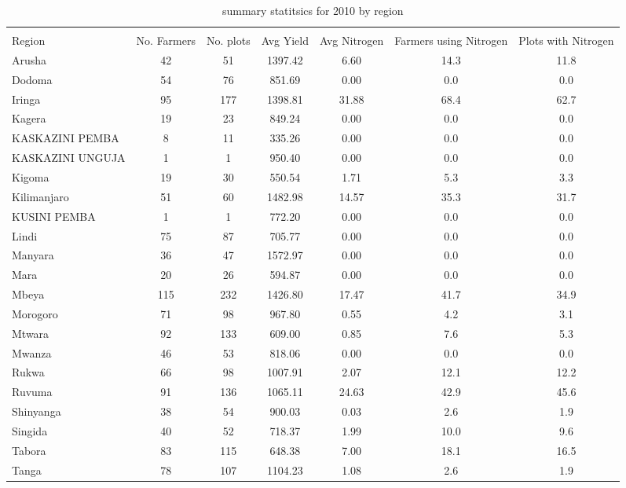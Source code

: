 \documentclass{article}
\begin{document}
\begin{table}
	\caption{summary statitsics for 2010 by region}
	\label{}
\begin{tabular}{@{\extracolsep{5pt}}lcccccc}
\\[-1.8ex]\hline 
\hline \\[-1.8ex]
Region & \multicolumn{1}{c}{No. Farmers} & \multicolumn{1}{c}{No. plots} & \multicolumn{1}{c}{Avg Yield} & \multicolumn{1}{c}{Avg Nitrogen} & \multicolumn{1}{c}{Farmers using Nitrogen} &\multicolumn{1}{c}{Plots with Nitrogen} \\
\hline
Arusha & 42 & 51 & 1397.42 & 6.60 & 14.3 & 11.8 \\ 
Dodoma & 54  & 76 & 851.69 & 0.00 & 0.0 & 0.0 \\
Iringa & 95 & 177 & 1398.81 & 31.88 & 68.4 & 62.7 \\
Kagera & 19 & 23 & 849.24 & 0.00 & 0.0 & 0.0 \\
KASKAZINI PEMBA & 8 & 11 & 335.26 & 0.00 & 0.0 & 0.0 \\
KASKAZINI UNGUJA & 1 & 1 & 950.40 & 0.00 & 0.0 & 0.0 \\
Kigoma & 19 & 30 & 550.54 & 1.71 & 5.3 & 3.3 \\
Kilimanjaro & 51 & 60 & 1482.98 & 14.57 & 35.3 & 31.7 \\
KUSINI PEMBA & 1 & 1 & 772.20 & 0.00 & 0.0 & 0.0 \\
Lindi & 75 & 87 & 705.77 & 0.00 & 0.0 & 0.0 \\
Manyara & 36 & 47 & 1572.97 & 0.00 & 0.0 & 0.0 \\
Mara & 20 & 26 & 594.87 & 0.00 & 0.0 & 0.0 \\
Mbeya & 115 & 232 & 1426.80 & 17.47 & 41.7 & 34.9 \\
Morogoro & 71 & 98 & 967.80 & 0.55 & 4.2 & 3.1 \\
Mtwara & 92 & 133 & 609.00 & 0.85 & 7.6 & 5.3 \\
Mwanza & 46 & 53 & 818.06 & 0.00 & 0.0 & 0.0 \\
Rukwa & 66 & 98 & 1007.91 & 2.07 & 12.1 & 12.2 \\
Ruvuma & 91 & 136 & 1065.11 & 24.63 & 42.9 & 45.6 \\
Shinyanga & 38 & 54 & 900.03 & 0.03 & 2.6 & 1.9 \\
Singida & 40 & 52 & 718.37 & 1.99 & 10.0 & 9.6 \\
Tabora & 83 & 115 & 648.38 & 7.00 & 18.1 & 16.5 \\
Tanga & 78 & 107 & 1104.23 & 1.08 & 2.6 & 1.9 \\
\hline
\end{tabular}
\end{table}
\end{document}

